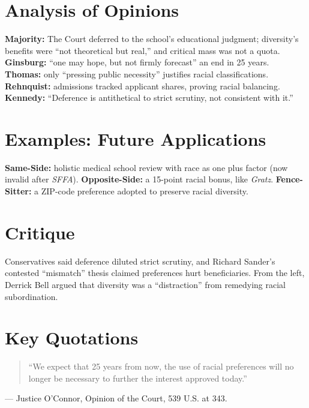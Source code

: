 \documentclass[12pt]{article}
\begin{document}
\section{Analysis of Opinions}
\textbf{Majority:} The Court deferred to the school's educational judgment; diversity's benefits were ``not theoretical but real,'' and critical mass was not a quota. \textbf{Ginsburg:} ``one may hope, but not firmly forecast'' an end in 25 years. \textbf{Thomas:} only ``pressing public necessity'' justifies racial classifications. \textbf{Rehnquist:} admissions tracked applicant shares, proving racial balancing. \textbf{Kennedy:} ``Deference is antithetical to strict scrutiny, not consistent with it.''

\section{Examples: Future Applications}
\textbf{Same-Side:} holistic medical school review with race as one plus factor (now invalid after \textit{SFFA}). \textbf{Opposite-Side:} a 15-point racial bonus, like \textit{Gratz}. \textbf{Fence-Sitter:} a ZIP-code preference adopted to preserve racial diversity.

\section{Critique}
Conservatives said deference diluted strict scrutiny, and Richard Sander's contested ``mismatch'' thesis claimed preferences hurt beneficiaries. From the left, Derrick Bell argued that diversity was a ``distraction'' from remedying racial subordination.

\section{Key Quotations}
\begin{quote}
``We expect that 25 years from now, the use of racial preferences will no longer be necessary to further the interest approved today.''
\end{quote}
\noindent --- Justice O'Connor, Opinion of the Court, 539 U.S. at 343.
\end{document}
